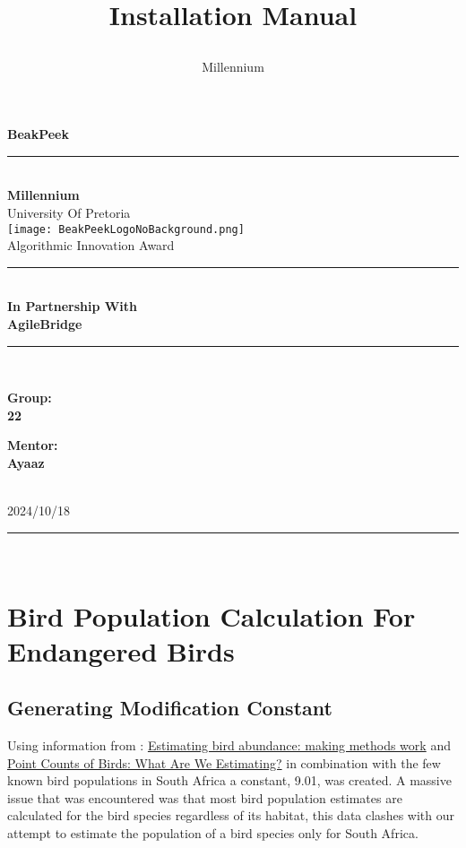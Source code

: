 \documentclass[a4paper]{article}
\title{

\\
{Installation Manual}
}
\author{Millennium}
\begin{document}
\begin{titlepage}

\begin{center}

{\Huge \bf BeakPeek}\\[10pt]
\rule{\textwidth}{1pt}\\[20pt]
{\bf \huge \sc Millennium} \\[10pt]
{\huge University Of Pretoria} \\[15pt]
\texttt{[image: BeakPeekLogoNoBackground.png]}\\[15pt]
{\huge Algorithmic Innovation Award}\\[60pt]
\rule{8cm}{1pt}\\[5pt]
{\bf \huge \sc In Partnership With}\\[15pt]
{\huge \bf AgileBridge}\\[5pt]
\rule{8cm}{1pt}\\[50pt]

\begin{minipage}[t]{10cm}
	{\Large{\bf Group:\\ 22}}
\end{minipage}\hfill\begin{minipage}[t]{5cm}\raggedleft
	{\Large{\bf Mentor: \\Ayaaz\\ }}
\end{minipage} \\[90pt]
{\Large 2024/10/18} \\ [5pt]

\rule{\textwidth}{1pt}\\[10pt]

\end{center}

\vfill

\end{titlepage}

\newpage

\tableofcontents

\newpage

\section{Bird Population Calculation For Endangered Birds}
\subsection{Generating Modification Constant}

Using information from : \href{https://core.ac.uk/download/pdf/9821458.pdf}{Estimating bird abundance: making methods work} and \href{https://www.fs.usda.gov/psw/publications/documents/psw_gtr149/psw_gtr149_pg117_124.pdf}{Point Counts of Birds: What Are We Estimating?} in combination with the few known bird populations in South Africa a constant, 9.01, was created. A massive issue that was encountered was that most bird population estimates are calculated for the bird species regardless of its habitat, this data clashes with our attempt to estimate the population of a bird species only for South Africa.
\end{document}
